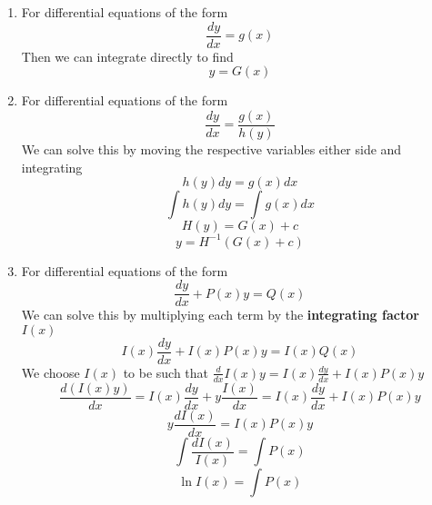 \documentclass[11pt,titlepage]{article}
\numberwithin{equation}{subsection}
\begin{document}
\begin{enumerate}
    \item For differential equations of the form
    \begin{equation}
        \frac{dy}{dx}=g(x)
    \end{equation}
    Then we can integrate directly to find 
    \begin{equation}
        y=G(x)
    \end{equation}
    \item For differential equations of the form
    \begin{equation}
        \frac{dy}{dx}=\frac{g(x)}{h(y)}
    \end{equation}
    We can solve this by moving the respective variables either side and integrating
    \begin{equation}
        h(y) dy=g(x)dx
    \end{equation}
    \begin{equation}
        \int h(y)dy=\int g(x) dx
    \end{equation}
    \begin{equation}
        H(y)=G(x)+c
    \end{equation}
    \begin{equation}
        y=H^{-1}(G(x)+c)
    \end{equation}
\item For differential equations of the form
\begin{equation}
    \frac{dy}{dx}+P(x)y=Q(x)
\end{equation}
We can solve this by multiplying each term by the \textbf{integrating factor} $I(x)$
\begin{equation}\label{eq:2210}
    I(x)\frac{dy}{dx}+I(x)P(x)y=I(x)Q(x)
\end{equation}
We choose $I(x)$ to be such that $\frac{d}{dx}I(x)y=I(x)\frac{dy}{dx}+I(x)P(x)y$
\begin{equation}\label{eq:2211}
    \frac{d(I(x)y)}{dx}=I(x)\frac{dy}{dx}+y\frac{I(x)}{dx}=I(x)\frac{dy}{dx}+I(x)P(x)y
\end{equation}
\begin{equation}
    y\frac{dI(x)}{dx}=I(x)P(x)y
\end{equation}
\begin{equation}
    \int \frac{dI(x)}{I(x)}=\int P(x)
\end{equation}
\begin{equation}
    \ln I(x)=\int P(x)
\end{equation}
\begin{equation}

\end{equation}
\end{enumerate}
\end{document}

